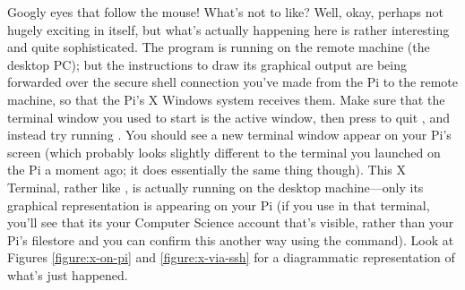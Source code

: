 
Googly eyes that follow the mouse! What's not to like? Well, okay, perhaps not hugely exciting in itself, but what's actually happening here is rather interesting and quite sophisticated. The  program is running on the remote machine (the desktop PC); but the instructions to draw its graphical output are being forwarded over the secure shell connection you've made from the Pi to the remote machine, so that the Pi's X Windows system receives them. Make sure that the terminal window you used to start  is the active window, then press  to quit , and instead try running . You should see a new terminal window appear on your Pi's screen (which probably looks slightly different to the terminal you launched on the Pi a moment ago; it does essentially the same thing though). This X Terminal, rather like , is actually running on the desktop machine---only its graphical representation is appearing on your Pi (if you use  in that terminal, you'll see that its your Computer Science account that's visible, rather than your Pi's filestore and you can confirm this another way using the  command). Look at Figures \ref{figure:x-on-pi} and \ref{figure:x-via-ssh} for a diagrammatic representation of what's just happened.

